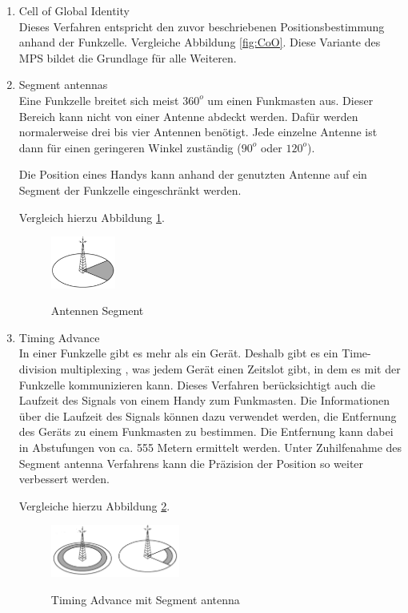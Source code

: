 \begin{enumerate}
\item Cell of Global Identity \\
Dieses Verfahren entspricht den zuvor beschriebenen Positionsbestimmung anhand der Funkzelle. Vergleiche Abbildung \ref{fig:CoO}. Diese Variante des MPS bildet die Grundlage für alle Weiteren.
\item Segment antennas \\
Eine Funkzelle breitet sich meist $360^{o}$ um einen Funkmasten aus. Dieser Bereich kann nicht von einer Antenne abdeckt werden. Dafür werden normalerweise drei bis vier Antennen benötigt. Jede einzelne Antenne ist dann für einen geringeren Winkel zuständig ($90^{o}$ oder $120^{o}$).

Die Position eines Handys kann anhand der genutzten Antenne auf ein Segment der Funkzelle eingeschränkt werden.
\cite[S. 208]{Schiller2004}

Vergleich hierzu Abbildung \ref{fig:SA}.

\begin{figure}[h]
\centering
\includegraphics[width=0.2\textwidth]{ref/images/SegmentAntennas.PNG}
\caption[Antennen Segment]{Antennen Segment}
\label{fig:SA}
\cite[S. 209]{Schiller2004}
\end{figure}

\item Timing Advance \\
In einer Funkzelle gibt es mehr als ein Gerät. Deshalb gibt es ein \glqq Time-division multiplexing \grqq , was jedem Gerät einen Zeitslot gibt, in dem es mit der Funkzelle kommunizieren kann. Dieses Verfahren berücksichtigt auch die Laufzeit des Signals von einem Handy zum Funkmasten. Die Informationen über die Laufzeit des Signals können dazu verwendet werden, die Entfernung des Geräts zu einem Funkmasten zu bestimmen. Die Entfernung kann dabei in Abstufungen von ca. 555 Metern ermittelt werden. Unter Zuhilfenahme des Segment antenna Verfahrens kann die Präzision der Position so weiter verbessert werden.
\cite[S. 208]{Schiller2004}

Vergleiche hierzu Abbildung \ref{fig:TA}.

\begin{figure}[h]
\centering
\includegraphics[width=0.4\textwidth]{ref/images/TimingAdvance.PNG}
\caption[Timing Advance mit Segment antenna]{Timing Advance mit Segment antenna}
\label{fig:TA}
\cite[S. 209]{Schiller2004}
\end{figure}


\end{enumerate}
